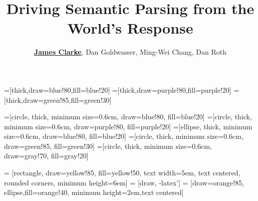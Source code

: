 \makeatletter
{}
\makeatother

\usenavigationsymbolstemplate{}

\usepackage{babel}

=[thick,draw=blue!80,fill=blue!20]
=[thick,draw=purple!80,fill=purple!20]
=[thick,draw=green!85,fill=green!30]

=[circle,
                   thick,
                   minimum size=0.6cm,
                   draw=blue!80,
                   fill=blue!20]
=[circle,
                    thick,
                    minimum size=0.6cm,
                    draw=purple!80,
                    fill=purple!20]
=[ellipse,
                    thick,
                    minimum size=0.6cm,
                    draw=blue!80,
                    fill=blue!20]
=[circle,
                      thick,
                      minimum size=0.6cm,
                      draw=green!85,
                      fill=green!30]
=[circle,
                      thick,
                      minimum size=0.6cm,
                      draw=gray!70,
                      fill=gray!20]

 = [rectangle, draw=yellow!85, fill=yellow!50,
text width=5em, text centered, rounded corners, minimum height=6em]
 = [draw, -latex']
 = [draw=orange!85, ellipse,fill=orange!40,
minimum height=2em,text centered]



\title[] %
{Driving Semantic Parsing from the World's Response}


\author[Clarke, Goldwasser, Chang, Roth] %
{\textbf{\underline{James Clarke}}, Dan Goldwasser, Ming-Wei Chang, Dan Roth}

